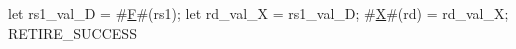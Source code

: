let rs1_val_D = #\hyperref[sailRISCVzF]{F}#(rs1);
let rd_val_X  = rs1_val_D;
#\hyperref[sailRISCVzX]{X}#(rd)         = rd_val_X;
RETIRE_SUCCESS
